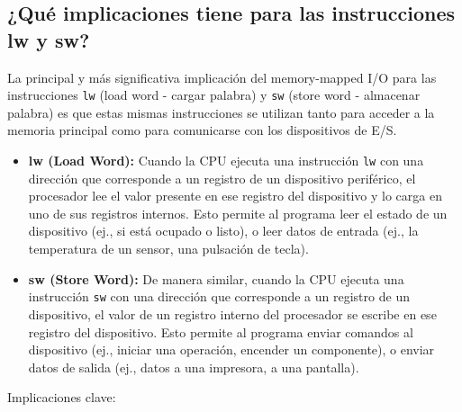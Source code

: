 \documentclass[12pt, a4paper]{article}
\begin{document}
\subsection*{¿Qué implicaciones tiene para las instrucciones lw y sw?}
La principal y más significativa implicación del memory-mapped I/O para las instrucciones \texttt{lw} (load word - cargar palabra) y \texttt{sw} (store word - almacenar palabra) es que estas mismas instrucciones se utilizan tanto para acceder a la memoria principal como para comunicarse con los dispositivos de E/S.
\begin{itemize}
    \item \textbf{lw (Load Word):} Cuando la CPU ejecuta una instrucción \texttt{lw} con una dirección que corresponde a un registro de un dispositivo periférico, el procesador lee el valor presente en ese registro del dispositivo y lo carga en uno de sus registros internos. Esto permite al programa leer el estado de un dispositivo (ej., si está ocupado o listo), o leer datos de entrada (ej., la temperatura de un sensor, una pulsación de tecla).
    \item \textbf{sw (Store Word):} De manera similar, cuando la CPU ejecuta una instrucción \texttt{sw} con una dirección que corresponde a un registro de un dispositivo, el valor de un registro interno del procesador se escribe en ese registro del dispositivo. Esto permite al programa enviar comandos al dispositivo (ej., iniciar una operación, encender un componente), o enviar datos de salida (ej., datos a una impresora, a una pantalla).
\end{itemize}
Implicaciones clave:
\end{document}
